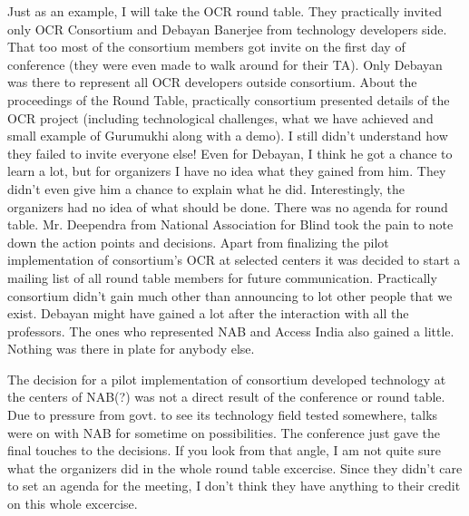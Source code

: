 Just as an example, I will take the OCR round table. They practically invited only OCR Consortium and Debayan Banerjee from technology developers side. That too most of the consortium members got invite on the first day of conference (they were even made to walk around for their TA). Only Debayan was there to represent all OCR developers outside consortium. About the proceedings of the Round Table, practically consortium presented details of the OCR project  (including technological challenges, what we have achieved and small example of Gurumukhi along with a demo). I still didn't understand how they failed to invite everyone else! Even for Debayan, I think he got a chance to learn a lot, but for organizers I have no idea what they gained from him. They didn't even give him a chance to explain what he did. Interestingly, the organizers had no idea of what should be done. There was no agenda for round table. Mr. Deependra from National Association for Blind took the pain to note down the action points and decisions. Apart from finalizing the pilot implementation of consortium's OCR at selected centers it was decided to start a mailing list of all round table members for future communication. Practically consortium didn't gain much other than announcing to lot other people that we exist. Debayan might have gained a lot after the interaction with all the professors. The ones who represented NAB and Access India also gained a little. Nothing was there in plate for anybody else.

The decision for a pilot implementation of consortium developed technology at the centers of NAB(?) was not a direct result of the conference or round table. Due to pressure from govt. to see its technology field tested somewhere, talks were on with NAB for sometime on possibilities. The conference just gave the final touches to the decisions. If you look from that angle, I am not quite sure what the organizers did in the whole round table excercise. Since they didn't care to set an agenda for the meeting, I don't think they have anything to their credit on this whole excercise. 

